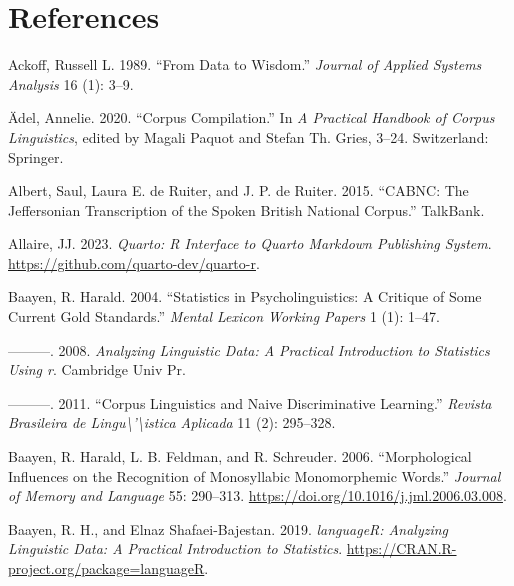 \documentclass[
  letterpaper,
  DIV=11,
  numbers=noendperiod]{scrreprt}
\newlength{\cslhangindent}
\newenvironment{CSLReferences}[2] %
 {\begin{list}{}{%
  \setlength{\itemindent}{0pt}
  \setlength{\leftmargin}{0pt}
  \setlength{\parsep}{0pt}
  \ifodd #1
   \setlength{\leftmargin}{\cslhangindent}
   \setlength{\itemindent}{-1\cslhangindent}
  \fi
  \setlength{\itemsep}{#2\baselineskip}}}
 {\end{list}}
\theoremstyle{definition}
\theoremstyle{remark}
\begin{document}

\chapter*{References}\label{references}


\label{refs}
\begin{CSLReferences}{1}{0}
Ackoff, Russell L. 1989. {``From Data to Wisdom.''} \emph{Journal of
Applied Systems Analysis} 16 (1): 3--9.

Ädel, Annelie. 2020. {``Corpus Compilation.''} In \emph{A Practical
Handbook of Corpus Linguistics}, edited by Magali Paquot and Stefan Th.
Gries, 3--24. Switzerland: Springer.

Albert, Saul, Laura E. de Ruiter, and J. P. de Ruiter. 2015. {``CABNC:
The Jeffersonian Transcription of the Spoken British National Corpus.''}
TalkBank.

Allaire, JJ. 2023. \emph{Quarto: R Interface to Quarto Markdown
Publishing System}. \url{https://github.com/quarto-dev/quarto-r}.

Baayen, R. Harald. 2004. {``Statistics in Psycholinguistics: A Critique
of Some Current Gold Standards.''} \emph{Mental Lexicon Working Papers}
1 (1): 1--47.

---------. 2008. \emph{Analyzing Linguistic Data: A Practical
Introduction to Statistics Using r}. Cambridge Univ Pr.

---------. 2011. {``Corpus Linguistics and Naive Discriminative
Learning.''} \emph{Revista Brasileira de
Lingu{\textbackslash{}}'{\textbackslash{}}istica Aplicada} 11 (2):
295--328.

Baayen, R. Harald, L. B. Feldman, and R. Schreuder. 2006.
{``Morphological Influences on the Recognition of Monosyllabic
Monomorphemic Words.''} \emph{Journal of Memory and Language} 55:
290--313. \url{https://doi.org/10.1016/j.jml.2006.03.008}.

Baayen, R. H., and Elnaz Shafaei-Bajestan. 2019. \emph{languageR:
Analyzing Linguistic Data: A Practical Introduction to Statistics}.
\url{https://CRAN.R-project.org/package=languageR}.


\end{CSLReferences}
\end{document}
